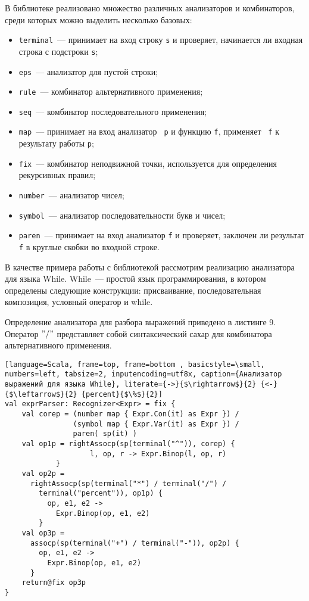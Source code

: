   В библиотеке реализовано множество различных анализаторов и комбинаторов, среди которых можно выделить несколько базовых:
  \begin{itemize}
      \item \lstinline[language=Scala]{terminal}~--- принимает на вход строку \lstinline[language=Scala]{s} и проверяет, начинается ли входная строка с подстроки \lstinline[language=Scala]{s};
      \item \lstinline[language=Scala]{eps}~--- анализатор для пустой строки;
      \item \lstinline[language=Scala]{rule}~--- комбинатор альтернативного применения;
      \item \lstinline[language=Scala]{seq}~--- комбинатор последовательного применения;
      \item \lstinline[language=Scala]{map}~--- принимает на вход анализатор \lstinline[language=Scala]{ p} и функцию \lstinline[language=Scala]{f}, применяет \lstinline[language=Scala]{ f} к результату работы \lstinline[language=Scala]{p};
      \item \lstinline[language=Scala]{fix}~--- комбинатор неподвижной точки, используется для определения рекурсивных правил;
      \item \lstinline[language=Scala]{number}~--- анализатор чисел;
      \item \lstinline[language=Scala]{symbol}~--- анализатор последовательности букв и чисел;
      \item \lstinline[language=Scala]{paren}~--- принимает на вход анализатор \lstinline[language=Scala]{f} и проверяет, заключен ли результат \lstinline[language=Scala]{f} в круглые скобки во входной строке.
  \end{itemize}
  
   В качестве примера работы с библиотекой рассмотрим реализацию анализатора для языка While. While~--- простой язык программирования, в котором определены следующие конструкции: присваивание, последовательная композиция, условный оператор и while.
   
   Определение анализатора для разбора выражений приведено в листинге 9. Оператор $"/"$ представляет собой синтаксический сахар для комбинатора альтернативного применения. 
  
  \begin{lstlisting}[language=Scala, frame=top, frame=bottom , basicstyle=\small, numbers=left, tabsize=2, inputencoding=utf8x, caption={Анализатор выражений для языка While}, literate={->}{$\rightarrow$}{2} {<-}{$\leftarrow$}{2} {percent}{$\%$}{2}]
val exprParser: Recognizer<Expr> = fix {
    val corep = (number map { Expr.Con(it) as Expr }) /
                (symbol map { Expr.Var(it) as Expr }) /
                paren( sp(it) )
    val op1p = rightAssocp(sp(terminal("^")), corep) {
                    l, op, r -> Expr.Binop(l, op, r) 
            }
    val op2p =
      rightAssocp(sp(terminal("*") / terminal("/") / 
        terminal("percent")), op1p) {
          op, e1, e2 ->
            Expr.Binop(op, e1, e2)
        }
    val op3p =
      assocp(sp(terminal("+") / terminal("-")), op2p) {
        op, e1, e2 ->
          Expr.Binop(op, e1, e2)
      }
    return@fix op3p
}
  \end{lstlisting}
  

